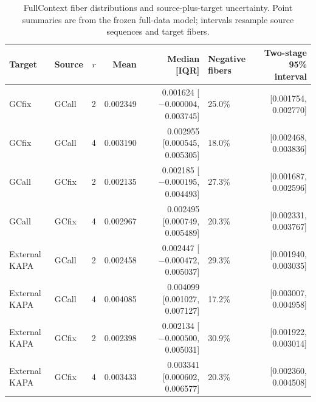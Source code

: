 \documentclass[10pt]{article}
\begin{document}
\begin{table}[H]
\centering
\scriptsize
\begin{tabular}{@{}llrrrlr@{}}
\toprule
Target & Source & $r$ & Mean & Median [IQR] & Negative fibers & Two-stage 95\% interval \\
\midrule
GCfix & GCall & 2 & 0.002349 & 0.001624 [$-0.000004$, 0.003745] & 25.0\% & [0.001754, 0.002770] \\
GCfix & GCall & 4 & 0.003190 & 0.002955 [0.000545, 0.005305] & 18.0\% & [0.002468, 0.003836] \\
GCall & GCfix & 2 & 0.002135 & 0.002185 [$-0.000195$, 0.004493] & 27.3\% & [0.001687, 0.002596] \\
GCall & GCfix & 4 & 0.002967 & 0.002495 [0.000749, 0.005489] & 20.3\% & [0.002331, 0.003767] \\
External KAPA & GCall & 2 & 0.002458 & 0.002447 [$-0.000472$, 0.005037] & 29.3\% & [0.001940, 0.003035] \\
External KAPA & GCall & 4 & 0.004085 & 0.004099 [0.001027, 0.007127] & 17.2\% & [0.003007, 0.004958] \\
External KAPA & GCfix & 2 & 0.002398 & 0.002134 [$-0.000500$, 0.005031] & 30.9\% & [0.001922, 0.003014] \\
External KAPA & GCfix & 4 & 0.003433 & 0.003341 [0.000602, 0.006577] & 20.3\% & [0.002360, 0.004508] \\
\bottomrule
\end{tabular}
\caption{FullContext fiber distributions and source-plus-target uncertainty. Point summaries are from the frozen full-data model; intervals resample source sequences and target fibers.}
\label{tab:s-p5-distributions}
\end{table}
\end{document}
